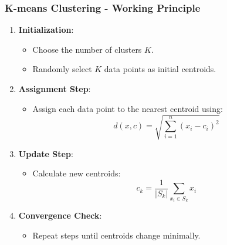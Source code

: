 \documentclass[aspectratio=169]{beamer}
\begin{document}
\begin{frame}[fragile]
    \frametitle{K-means Clustering - Working Principle}
    \begin{enumerate}
        \item \textbf{Initialization}:
            \begin{itemize}
                \item Choose the number of clusters \(K\).
                \item Randomly select \(K\) data points as initial centroids.
            \end{itemize}
        \item \textbf{Assignment Step}:
            \begin{itemize}
                \item Assign each data point to the nearest centroid using:
                \begin{equation}
                    d(x, c) = \sqrt{\sum_{i=1}^{n} (x_i - c_i)^2}
                \end{equation}
            \end{itemize}
        \item \textbf{Update Step}:
            \begin{itemize}
                \item Calculate new centroids:
                \begin{equation}
                    c_k = \frac{1}{|S_k|} \sum_{x_i \in S_k} x_i
                \end{equation}
            \end{itemize}
        \item \textbf{Convergence Check}:
            \begin{itemize}
                \item Repeat steps until centroids change minimally.
            \end{itemize}
    \end{enumerate}
\end{frame}
\end{document}

